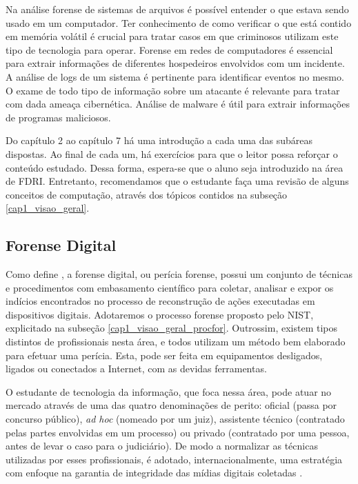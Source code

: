     \vspace{4mm}
    
    \hspace{1cm}
    Na análise forense de sistemas de arquivos é possível entender o que estava sendo usado em um computador. Ter conhecimento de como verificar o que está contido em memória volátil é crucial para tratar casos em que criminosos utilizam este tipo de tecnologia para operar. Forense em redes de computadores é essencial para extrair informações de diferentes hospedeiros envolvidos com um incidente. A análise de logs de um sistema é pertinente para identificar eventos no mesmo. O exame de todo tipo de informação sobre um atacante é relevante para tratar com dada ameaça cibernética. Análise de malware é útil para extrair informações de programas maliciosos.
    
    \vspace{4mm}
	
	\hspace{1cm}
	Do capítulo 2 ao capítulo 7 há uma introdução a cada uma das subáreas dispostas. Ao final de cada um, há exercícios para que o leitor possa reforçar o conteúdo estudado. Dessa forma, espera-se que o aluno seja introduzido na área de FDRI. Entretanto, recomendamos que o estudante faça uma revisão de alguns conceitos de computação, através dos tópicos contidos na subseção \ref{cap1_visao_geral}.
	
   \subsection{Forense Digital}
    
    \hspace{1cm}
    Como define , a forense digital, ou perícia forense, possui um conjunto de técnicas e procedimentos com embasamento científico para coletar, analisar e expor os indícios encontrados no processo de reconstrução de ações executadas em dispositivos digitais. Adotaremos o processo forense proposto pelo NIST, explicitado na subseção \ref{cap1_visao_geral_procfor}. Outrossim, existem tipos distintos de profissionais nesta área, e todos utilizam um método bem elaborado para efetuar uma perícia. Esta, pode ser feita em equipamentos desligados, ligados ou conectados a Internet, com as devidas ferramentas.
    
    \vspace{4mm}
        
    \hspace{1cm}
    O estudante de tecnologia da informação, que foca nessa área, pode atuar no mercado através de uma das quatro denominações de perito: oficial (passa por concurso público), \textit{ad hoc} (nomeado por um juiz), assistente técnico (contratado pelas partes envolvidas em um processo) ou privado (contratado por uma pessoa, antes de levar o caso para o judiciário). De modo a normalizar as técnicas utilizadas por esses profissionais, é adotado, internacionalmente, uma estratégia com enfoque na garantia de integridade das mídias digitais coletadas \cite{vecchia2019}.
    

